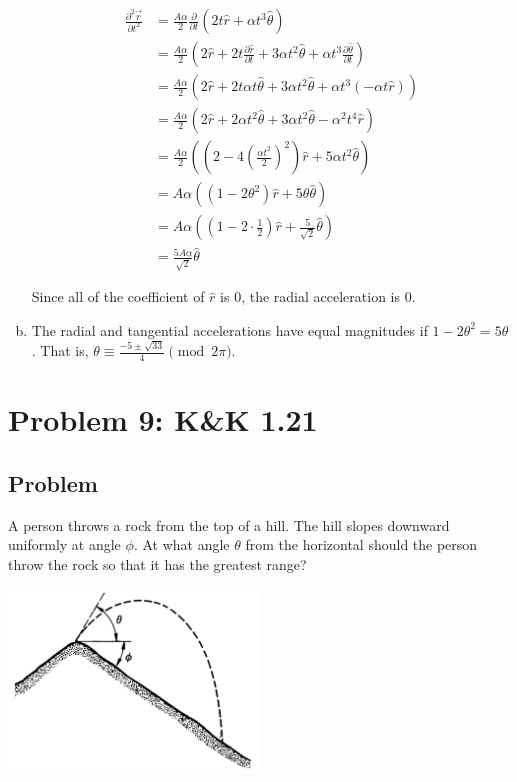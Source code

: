 \documentclass[solutions]{esg8012pset}
\begin{document}
\begin{enumerate}[a.]
\begin{align*}
            \\
            \frac{\partial^2 \vec r}{\partial t^2} & = \frac{A\alpha}{2}\frac{\partial}{\partial t}\left( 2t\hat r + \alpha t^3 \hat \theta\right) \\
            & = \frac{A\alpha}{2}\left( 2\hat r + 2t\frac{\partial \hat r}{\partial t} + 3\alpha t^2 \hat \theta + \alpha t^3\frac{\partial \hat \theta}{\partial t}\right) \\
            & = \frac{A\alpha}{2}\left( 2\hat r + 2t\alpha t \hat \theta + 3\alpha t^2 \hat \theta + \alpha t^3(-\alpha t \hat r)\right) \\
            & = \frac{A\alpha}{2}\left( 2\hat r + 2\alpha t^2 \hat \theta + 3\alpha t^2 \hat \theta - \alpha^2 t^4\hat r\right) \\
            & = \frac{A\alpha}{2}\left( \left(2- 4\left(\frac{\alpha t^2}{2}\right)^2\right)\hat r + 5\alpha t^2\hat \theta \right) \\
            & = A\alpha\left( \left(1- 2\theta^2\right)\hat r + 5\theta\hat \theta \right) \\
            & = A\alpha\left( \left(1- 2\cdot\frac{1}{2}\right)\hat r + \frac{5}{\sqrt{2}}\hat \theta \right) \\
            & = \frac{5A\alpha}{\sqrt{2}}\hat \theta
          \end{align*} \par
          Since all of the coefficient of $\hat r$ is 0, the radial acceleration is 0.
    \item  The radial and tangential accelerations have equal magnitudes if $1- 2\theta^2 = 5\theta$.  That is, $\theta \equiv \frac{-5\pm\sqrt{33}}{4}\pmod{2\pi}$.
  \end{enumerate}
\section*{Problem 9: K\&K 1.21}
\subsection*{Problem}
  A person throws a rock from the top of a hill. The hill slopes downward uniformly at angle $\phi$. At
  what angle $\theta$ from the horizontal should the person throw the rock so that it has the greatest
  range?
  \begin{center}\includegraphics[width=0.5\textwidth]{ps01_4}\end{center}
\end{document}
